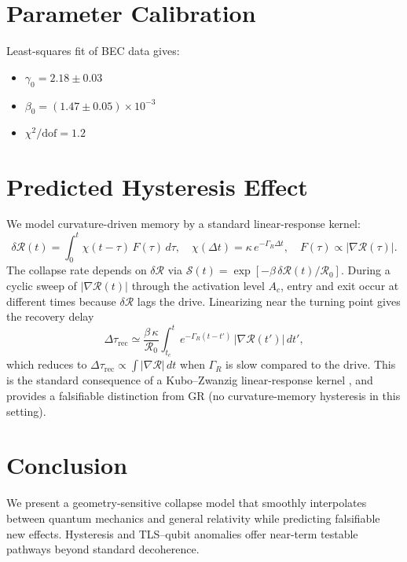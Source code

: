 \documentclass[aps,prl,twocolumn,nofootinbib]{revtex4-2}
\begin{document}
\section{Parameter Calibration}

Least-squares fit of BEC data \cite{BECPub} gives:
\begin{itemize}
  \item $\gamma_0 = 2.18 \pm 0.03$
  \item $\beta_0 = (1.47 \pm 0.05)\times 10^{-3}$
  \item $\chi^2/\mathrm{dof} = 1.2$
\end{itemize}

\section{Predicted Hysteresis Effect}

We model curvature-driven memory by a standard linear-response kernel:
\begin{equation}
\delta\mathcal{R}(t)=\int_0^t \chi(t-\tau)\,F(\tau)\,d\tau, \quad
\chi(\Delta t)=\kappa\,e^{-\Gamma_R \Delta t}, \quad
F(\tau)\propto |\nabla\mathcal{R}(\tau)|.
\end{equation}
The collapse rate depends on $\delta\mathcal{R}$ via $\mathcal{S}(t)=\exp[-\beta\,\delta\mathcal{R}(t)/\mathcal{R}_0]$.
During a cyclic sweep of $|\nabla\mathcal{R}(t)|$ through the activation level $A_c$, entry and exit occur at different times because $\delta\mathcal{R}$ lags the drive. Linearizing near the turning point gives the recovery delay
\begin{equation}
\Delta \tau_{\mathrm{rec}} \simeq \frac{\beta\,\kappa}{\mathcal{R}_0}
\int_{t_c}^{t}\! e^{-\Gamma_R(t-t')}\,|\nabla \mathcal{R}(t')|\,dt' ,
\end{equation}
which reduces to $\Delta\tau_{\mathrm{rec}}\propto\!\int |\nabla\mathcal{R}|\,dt$ when $\Gamma_R$ is slow compared to the drive. This is the standard consequence of a Kubo--Zwanzig linear-response kernel \cite{Kubo1957,Zwanzig1960}, and provides a falsifiable distinction from GR (no curvature-memory hysteresis in this setting).

\section{Conclusion}

We present a geometry-sensitive collapse model that smoothly interpolates between quantum mechanics and general relativity while predicting falsifiable new effects. Hysteresis and TLS--qubit anomalies offer near-term testable pathways beyond standard decoherence.
\end{document}
